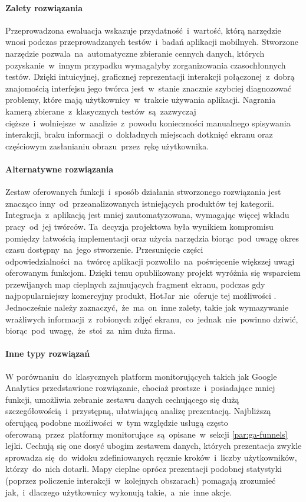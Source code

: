 \paragraph{Zalety rozwiązania}
Przeprowadzona ewaluacja wskazuje przydatność~i~wartość, którą narzędzie wnosi podczas przeprowadzanych testów~i~badań aplikacji mobilnych. Stworzone narzędzie pozwala~na~automatyczne zbieranie cennych danych, których pozyskanie~w~innym przypadku wymagałyby zorganizowania czasochłonnych testów. Dzięki intuicyjnej, graficznej reprezentacji interakcji połączonej~z~dobrą znajomością interfejsu jego twórca jest~w~stanie znacznie szybciej diagnozować problemy, które mają użytkownicy~w~trakcie używania aplikacji. Nagrania kamerą zbierane~z~klasycznych testów~są~zazwyczaj cięższe~i~wolniejsze~w~analizie~z~powodu konieczności manualnego spisywania interakcji, braku informacji~o~dokładnych miejscach dotknięć ekranu oraz częściowym zasłanianiu obrazu~przez~rękę użytkownika. 

\paragraph{Alternatywne rozwiązania}
Zestaw oferowanych funkcji~i~sposób działania stworzonego rozwiązania jest znacząco inny~od~przeanalizowanych istniejących produktów tej kategorii. Integracja~z~aplikacją jest mniej zautomatyzowana, wymagając więcej wkładu pracy~od~jej twórców. Ta~decyzja projektowa była wynikiem kompromisu pomiędzy łatwością implementacji oraz użycia narzędzia biorąc~pod~uwagę okres czasu dostępny~na~jego stworzenie. Przesunięcie części odpowiedzialności~na~twórcę aplikacji pozwoliło~na~poświęcenie większej uwagi oferowanym funkcjom. Dzięki temu opublikowany projekt wyróżnia się wsparciem przewijanych map cieplnych zajmujących fragment ekranu, podczas gdy najpopularniejszy komercyjny produkt, HotJar~nie~oferuje tej możliwości \cite{Hotjar_limitations}. Jednocześnie należy zaznaczyć,~że~ma~on~inne zalety, takie jak wymazywanie wrażliwych informacji~z~robionych zdjęć ekranu,~co~jednak~nie~powinno dziwić, biorąc~pod~uwagę,~że~stoi~za~nim duża firma.

\paragraph{Inne typy rozwiązań}
W porównaniu~do~klasycznych platform monitorujących takich jak Google Analytics przedstawione rozwiązanie, chociaż prostsze~i~posiadające mniej funkcji, umożliwia zebranie zestawu danych cechującego się dużą szczegółowością~i~przystępną, ułatwiającą analizę prezentacją. Najbliższą oferującą podobne możliwości~w~tym względzie usługą często oferowaną~przez~platformy monitorujące~są~opisane~w~sekcji \ref{par:ga-funnels} lejki. Cechują się one dosyć  ubogim zestawem danych, których prezentacja zwykle sprowadza się~do~widoku zdefiniowanych ręcznie kroków~i~liczby użytkowników, którzy~do~nich dotarli. Mapy cieplne oprócz prezentacji podobnej statystyki (poprzez policzenie interakcji~w~kolejnych obszarach) pomagają zrozumieć jak,~i~dlaczego użytkownicy wykonują takie,~a~nie~inne akcje.
